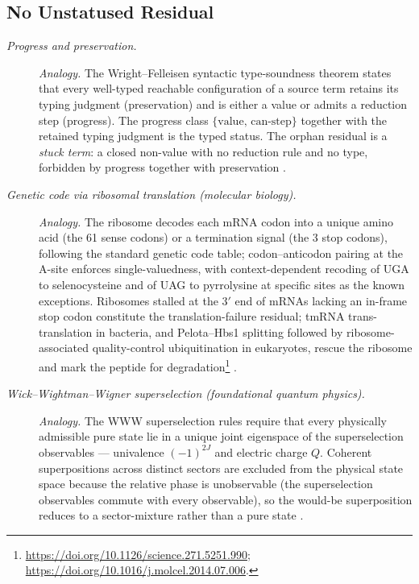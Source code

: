 \subsection*{ No Unstatused Residual}
\begingroup\small
\begin{description}
\item[\emph{Progress and preservation.}] \textit{Analogy.}
The Wright--Felleisen syntactic type-soundness theorem states that
every well-typed reachable configuration of a source term retains
its typing judgment (preservation) and is either a value or admits
a reduction step (progress).  The progress class
\(\{\text{value},\,\text{can-step}\}\) together with the retained
typing judgment is the  typed status.  The orphan residual is a
\emph{stuck term}: a closed non-value with no reduction rule and no
type, forbidden by progress together with preservation
\citep{WrightFelleisen1994SyntacticTypeSoundness}.

\item[\emph{Genetic code via ribosomal translation (molecular
biology).}] \textit{Analogy.}
The ribosome decodes each mRNA codon into a unique amino acid (the
61 sense codons) or a termination signal (the 3 stop codons),
following the standard genetic code table; codon--anticodon pairing
at the A-site enforces single-valuedness, with context-dependent
recoding of UGA to selenocysteine and of UAG to pyrrolysine at
specific sites as the known exceptions.  Ribosomes stalled at the 3\('\) end of mRNAs lacking an in-frame stop codon constitute the translation-failure residual; tmRNA trans-translation in bacteria, and Pelota--Hbs1 splitting followed by ribosome-associated quality-control ubiquitination in eukaryotes, rescue the ribosome and mark the peptide for degradation\footnote{\url{https://doi.org/10.1126/science.271.5251.990}; \url{https://doi.org/10.1016/j.molcel.2014.07.006}.}
\citep{Crick1968GeneticCode}.

\item[\emph{Wick--Wightman--Wigner superselection (foundational
quantum physics).}] \textit{Analogy.}
The WWW superselection rules require that every physically
admissible pure state lie in a unique joint eigenspace of the
superselection observables --- univalence \((-1)^{2J}\) and electric
charge \(Q\).
Coherent superpositions across distinct sectors are excluded from
the physical state space because the relative phase is unobservable
(the superselection observables commute with every observable), so
the would-be superposition reduces to a sector-mixture rather than a
pure state
\citep{WickWightmanWigner1952IntrinsicParity}.


\end{description}
